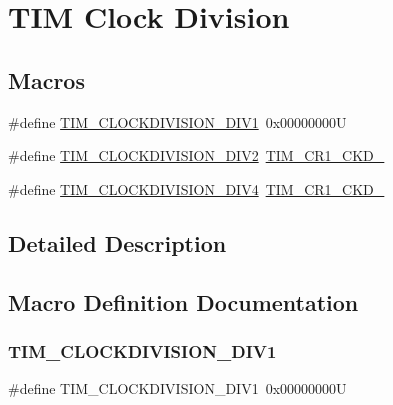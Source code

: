 \hypertarget{group___t_i_m___clock_division}{}\section{T\+IM Clock Division}
\label{group___t_i_m___clock_division}
\subsection*{Macros}
\begin{DoxyCompactItemize}
\item 
\#define \hyperlink{group___t_i_m___clock_division_ga309297ccd407a836ede6a42d4dc479c1}{T\+I\+M\+\_\+\+C\+L\+O\+C\+K\+D\+I\+V\+I\+S\+I\+O\+N\+\_\+\+D\+I\+V1}~0x00000000U
\item 
\#define \hyperlink{group___t_i_m___clock_division_gaf84a16da8edb80a3d8af91fbfc046181}{T\+I\+M\+\_\+\+C\+L\+O\+C\+K\+D\+I\+V\+I\+S\+I\+O\+N\+\_\+\+D\+I\+V2}~\hyperlink{group___peripheral___registers___bits___definition_ga458d536d82aa3db7d227b0f00b36808f}{T\+I\+M\+\_\+\+C\+R1\+\_\+\+C\+K\+D\+\_}
\item 
\#define \hyperlink{group___t_i_m___clock_division_ga7cac7491610ffc135ea9ed54f769ddbc}{T\+I\+M\+\_\+\+C\+L\+O\+C\+K\+D\+I\+V\+I\+S\+I\+O\+N\+\_\+\+D\+I\+V4}~\hyperlink{group___peripheral___registers___bits___definition_ga7ff2d6c2c350e8b719a8ad49c9a6bcbe}{T\+I\+M\+\_\+\+C\+R1\+\_\+\+C\+K\+D\+\_}
\end{DoxyCompactItemize}


\subsection{Detailed Description}


\subsection{Macro Definition Documentation}
\mbox{\label{group___t_i_m___clock_division_ga309297ccd407a836ede6a42d4dc479c1}} 
\subsubsection{\texorpdfstring{T\+I\+M\+\_\+\+C\+L\+O\+C\+K\+D\+I\+V\+I\+S\+I\+O\+N\+\_\+\+D\+I\+V1}{TIM\_CLOCKDIVISION\_DIV1}}
{\footnotesize\ttfamily \#define T\+I\+M\+\_\+\+C\+L\+O\+C\+K\+D\+I\+V\+I\+S\+I\+O\+N\+\_\+\+D\+I\+V1~0x00000000U}

